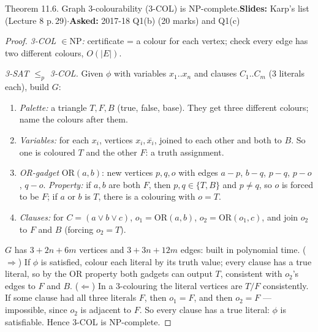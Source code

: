 \documentclass[10.5pt,a4paper]{article}
\newcommand{\src}[2]{{\footnotesize\color{gray!70!black}\textbf{Slides:} #1\enspace$\cdot$\enspace\textbf{Asked:} #2}\par}
\newcommand{\NP}{\mathrm{NP}}
\begin{document}
\begin{thm}{Theorem 11.6. Graph 3-colourability (3-COL) is NP-complete.}\src{Karp's list (Lecture 8 p.\,29)}{2017-18 Q1(b) (20 marks) and Q1(c)}\end{thm}
\begin{proof}
\emph{3-COL $\in\NP$:} certificate = a colour for each vertex; check every edge has two different colours, $O(|E|)$.

\emph{3-SAT $\le_p$ 3-COL.} Given $\phi$ with variables $x_1..x_n$ and clauses $C_1..C_m$ (3 literals each), build $G$:
\begin{enumerate}
\item \emph{Palette:} a triangle $T,F,B$ (true, false, base). They get three different colours; name the colours after them.
\item \emph{Variables:} for each $x_i$, vertices $x_i,\overline{x_i}$, joined to each other and both to $B$. So one is coloured $T$ and the other
$F$: a truth assignment.
\item \emph{OR-gadget} $\mathrm{OR}(a,b)$: new vertices $p,q,o$ with edges $a\!-\!p$, $b\!-\!q$, $p\!-\!q$, $p\!-\!o$, $q\!-\!o$.
\emph{Property:} if $a,b$ are both $F$, then $p,q\in\{T,B\}$ and $p\ne q$, so $o$ is forced to be $F$; if $a$ or $b$ is $T$, there is a
colouring with $o=T$.
\item \emph{Clauses:} for $C=(a\vee b\vee c)$, $o_1=\mathrm{OR}(a,b)$, $o_2=\mathrm{OR}(o_1,c)$, and join $o_2$ to $F$ and $B$ (forcing $o_2=T$).
\end{enumerate}
$G$ has $3+2n+6m$ vertices and $3+3n+12m$ edges: built in polynomial time.
($\Rightarrow$) If $\phi$ is satisfied, colour each literal by its truth value; every clause has a true literal, so by the OR property both gadgets
can output $T$, consistent with $o_2$'s edges to $F$ and $B$. ($\Leftarrow$) In a 3-colouring the literal vertices are $T/F$ consistently. If
some clause had all three literals $F$, then $o_1=F$, and then $o_2=F$ --- impossible, since $o_2$ is adjacent to $F$. So every clause has a true
literal: $\phi$ is satisfiable. Hence 3-COL is NP-complete.
\end{proof}
\end{document}

